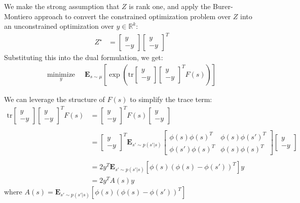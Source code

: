 \documentclass[11pt]{article}
\newcommand{\tr}{\text{tr}}
\begin{document}
We make the strong assumption that $Z$ is rank one, and apply the Burer-Montiero approach \cite{burer2003nonlinear} to convert the constrained optimization problem over $Z$ into an unconstrained optimization over $y\in \mathbb R^{k}$:
\begin{align}
  Z^\star & = \begin{bmatrix} y \\ -y \end{bmatrix} \begin{bmatrix} y \\ -y\end{bmatrix}^T
\end{align}
Substituting this into the dual formulation, we get:
\begin{align}
\underset{y}{\text{minimize}} & \;\; \mathbf{E}_{s\sim\mu} \left [ \exp\left (\tr  \begin{bmatrix} y \\ -y \end{bmatrix} \begin{bmatrix} y \\ -y\end{bmatrix}^T F(s) \right )  \right ]
\end{align}

We can leverage the structure of $F(s)$ to simplify the trace term:
\begin{align}
\tr  \begin{bmatrix} y \\ -y \end{bmatrix} \begin{bmatrix} y \\ -y \end{bmatrix}^T F(s)
    & = \begin{bmatrix} y \\ -y \end{bmatrix}^T F(s) \begin{bmatrix} y \\ -y \end{bmatrix} \\
\\  & =  \begin{bmatrix} y \\ -y \end{bmatrix}^T  \mathbf{E}_{s' \sim p(s'|s)}  \left[ \begin{array}{cc} \phi(s)\phi(s)^T & \phi(s)\phi(s')^T \\ \phi(s')\phi(s)^T & \phi(s)\phi(s)^T \end{array} \right]
 \begin{bmatrix} y \\ -y \end{bmatrix} \\
\\  & =  2 y^T \mathbf{E}_{s' \sim p(s'|s)} \left [\phi(s)(\phi(s)- \phi(s'))^T \right ] y
\\  & =  2 y^T A(s) y
\end{align}
where $A(s) = \mathbf{E}_{s' \sim p(s'|s)} \left [\phi(s)(\phi(s)- \phi(s'))^T \right ]$
\end{document}
